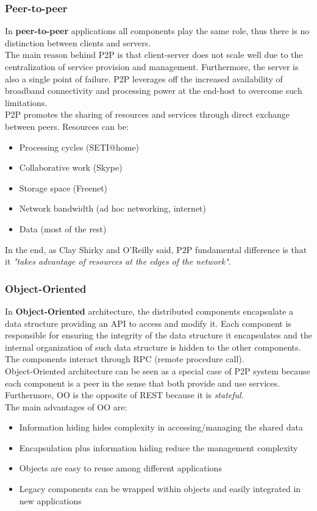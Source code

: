 \documentclass[10pt,a4paper]{article}
\begin{document}
\subsubsection{Peer-to-peer}
In \textbf{peer-to-peer} applications all components play the same role, thus there is no distinction between clients and servers. \\  The main reason behind P2P is that client-server does not scale well due to the centralization of service provision and management. Furthermore, the server is also a single point of failure. P2P leverages off the increased availability of broadband connectivity and processing power at the end-host to overcome such limitations. \\
P2P promotes the sharing of resources and services through direct exchange between peers. Resources can be:
\begin{itemize}
	\item Processing cycles (SETI@home)
	\item Collaborative work (Skype)
	\item Storage space (Freenet)
	\item Network bandwidth (ad hoc networking, internet)
	\item Data (most of the rest)
\end{itemize}
In the end, as Clay Shirky and O'Reilly said, P2P fundamental difference is that it \textit{"takes advantage of resources at the edges of the network"}.
\subsubsection{Object-Oriented}
In \textbf{Object-Oriented} architecture, the distributed components encapsulate a data structure providing an API to access and modify it. Each component is responsible for ensuring the integrity of the data structure it encapsulates and the internal organization of such data structure is hidden to the other components. The components interact through RPC (remote procedure call). \\
Object-Oriented architecture can be seen as a special case of P2P system because each component is a peer in the sense that both provide and use services. Furthermore, OO is the opposite of REST because it is \textit{stateful}. \\
The main advantages of OO are:
\begin{itemize}
	\item Information hiding hides complexity in accessing/managing the shared data
	\item Encapsulation plus information hiding reduce the management complexity
	\item Objects are easy to reuse among different applications
	\item Legacy components can be wrapped within objects and easily integrated in new applications
\end{itemize}
\end{document}
